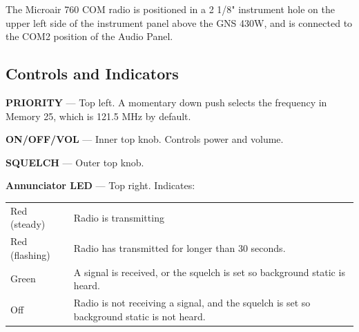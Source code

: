 The Microair 760 COM radio is positioned in a 2 1/8" instrument hole on the upper left side of the instrument panel above the GNS 430W, and is connected to the COM2 position of the Audio Panel.

\subsection*{Controls and Indicators}

\textbf{PRIORITY} --- Top left. A momentary down push selects the frequency in Memory 25, which is 121.5 MHz by default.

\textbf{ON/OFF/VOL} --- Inner top knob. Controls power and volume.

\textbf{SQUELCH} --- Outer top knob.

\textbf{Annunciator LED} --- Top right. Indicates:

\begin{tabular}{lp{2.9in}}
Red (steady)&Radio is transmitting\\
Red (flashing)&Radio has transmitted for longer than 30 seconds.\\
Green&A signal is received, or the squelch is set so background static is heard.\\
Off&Radio is not receiving a signal, and the squelch is set so background static is not heard.\\
\end{tabular}

